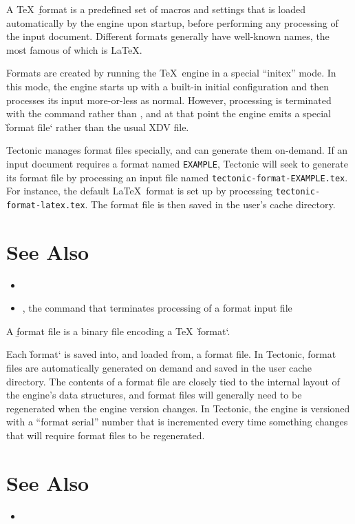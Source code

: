 
A \TeX\ \b{format} is a predefined set of macros and settings that is loaded
automatically by the engine upon startup, before performing any processing of
the input document. Different formats generally have well-known names, the most
famous of which is \LaTeX.

Formats are created by running the \TeX\ engine in a special “initex” mode. In
this mode, the engine starts up with a built-in initial configuration and then
processes its input more-or-less as normal. However, processing is terminated
with the  command rather than , and at that point the engine
emits a special \`format file` rather than the usual XDV file.

Tectonic manages format files specially, and can generate them on-demand. If an
input document requires a format named \texttt{EXAMPLE}, Tectonic will seek to
generate its format file by processing an input file named
\texttt{tectonic-format-EXAMPLE.tex}. For instance, the default \LaTeX\ format
is set up by processing \texttt{tectonic-format-latex.tex}. The format file is
then saved in the user's cache directory.

\section*{See Also}

\begin{itemize}
\item {}
\item {}, the command that terminates processing of a format input file
\end{itemize}

\tduxEmit



A \b{format file} is a binary file encoding a \TeX\ \`format`.

Each \`format` is saved into, and loaded from, a format file. In Tectonic,
format files are automatically generated on demand and saved in the user cache
directory. The contents of a format file are closely tied to the internal layout
of the engine's data structures, and format files will generally need to be
regenerated when the engine version changes. In Tectonic, the engine is
versioned with a “format serial” number that is incremented every time something
changes that will require format files to be regenerated.

\section*{See Also}

\begin{itemize}
\item {}
\end{itemize}
